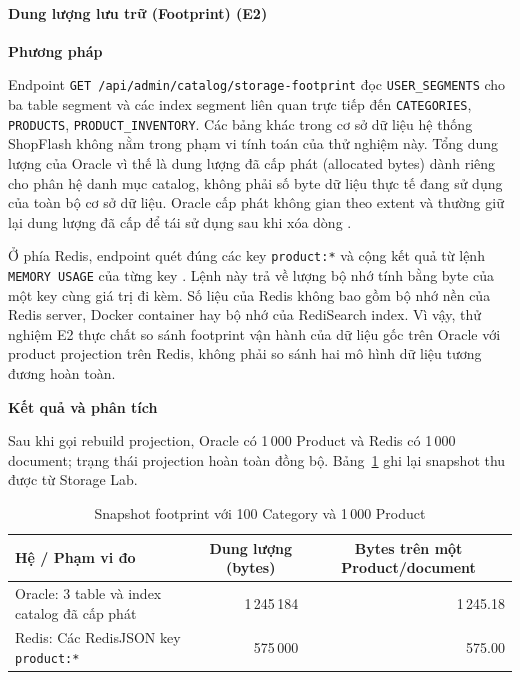 \paragraph{Dung lượng lưu trữ (Footprint) (E2)}

\noindent\textbf{Phương pháp}\par
Endpoint \texttt{GET /api/admin/catalog/storage-footprint} đọc \texttt{USER\_}\allowbreak\texttt{SEGMENTS} cho ba table segment và các index segment liên quan trực tiếp đến \texttt{CATEGORIES}, \texttt{PRODUCTS}, \texttt{PRODUCT\_INVENTORY}. Các bảng khác trong cơ sở dữ liệu hệ thống ShopFlash không nằm trong phạm vi tính toán của thử nghiệm này. Tổng dung lượng của Oracle vì thế là dung lượng đã cấp phát (allocated bytes) dành riêng cho phân hệ danh mục catalog, không phải số byte dữ liệu thực tế đang sử dụng của toàn bộ cơ sở dữ liệu. Oracle cấp phát không gian theo extent và thường giữ lại dung lượng đã cấp để tái sử dụng sau khi xóa dòng \cite{oracleLogicalStorage}.

Ở phía Redis, endpoint quét đúng các key \texttt{product:*} và cộng kết quả từ lệnh \texttt{MEMORY USAGE} của từng key \cite{redisMemoryUsage}. Lệnh này trả về lượng bộ nhớ tính bằng byte của một key cùng giá trị đi kèm. Số liệu của Redis không bao gồm bộ nhớ nền của Redis server, Docker container hay bộ nhớ của RediSearch index. Vì vậy, thử nghiệm E2 thực chất so sánh footprint vận hành của dữ liệu gốc trên Oracle với product projection trên Redis, không phải so sánh hai mô hình dữ liệu tương đương hoàn toàn.

\noindent\textbf{Kết quả và phân tích}\par
Sau khi gọi rebuild projection, Oracle có 1\,000 Product và Redis có 1\,000 document; trạng thái projection hoàn toàn đồng bộ. Bảng~\ref{tab:st-storage-footprint-results} ghi lại snapshot thu được từ Storage Lab.

\begin{table}[H]
    \centering
    \caption{Snapshot footprint với 100 Category và 1\,000 Product}
    \label{tab:st-storage-footprint-results}
    \begin{tabularx}{\textwidth}{@{}X r r@{}}
        \toprule
        Hệ / Phạm vi đo & \multicolumn{1}{c}{Dung lượng (bytes)} & \multicolumn{1}{c}{Bytes trên một Product/document} \\
        \midrule
        Oracle: 3 table và index catalog đã cấp phát & 1\,245\,184 & 1\,245.18 \\
        Redis: Các RedisJSON key \texttt{product:*} & 575\,000 & 575.00 \\
        \bottomrule
    \end{tabularx}
\end{table}

